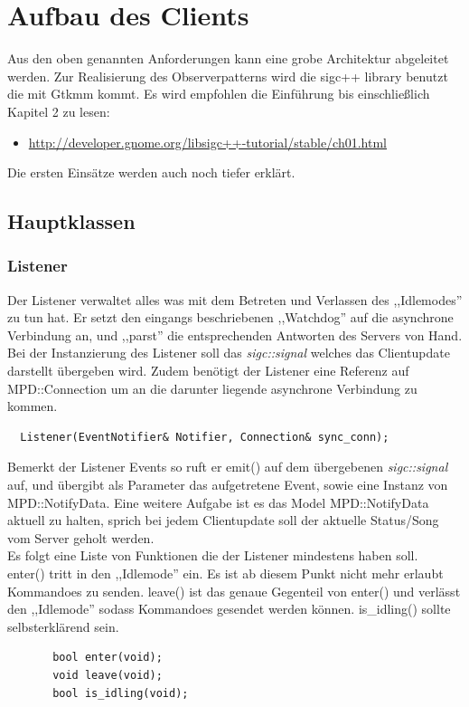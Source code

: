 \section{Aufbau des Clients}

Aus den oben genannten Anforderungen kann eine grobe Architektur abgeleitet werden.
Zur Realisierung des Observerpatterns wird die sigc++ library benutzt die mit Gtkmm kommt.
Es wird empfohlen die Einführung bis einschließlich Kapitel 2 zu lesen:
\begin{itemize}
\item \url{http://developer.gnome.org/libsigc++-tutorial/stable/ch01.html}
\end{itemize}
Die ersten Einsätze werden auch noch tiefer erklärt.


\subsection{Hauptklassen}

\subsubsection{Listener}
Der Listener verwaltet alles was mit dem Betreten und Verlassen des ,,Idlemodes''
zu tun hat. Er setzt den eingangs beschriebenen ,,Watchdog'' auf die asynchrone Verbindung an,
und ,,parst'' die entsprechenden Antworten des Servers von Hand. 
\\
Bei der Instanzierung des Listener soll das \textit{sigc::signal} welches das Clientupdate darstellt übergeben wird.
Zudem benötigt der Listener eine Referenz auf MPD::Connection um an die darunter liegende asynchrone Verbindung zu kommen.  
\begin{verbatim}
  Listener(EventNotifier& Notifier, Connection& sync_conn);
\end{verbatim}

Bemerkt der Listener Events so ruft er emit() auf dem übergebenen \textit{sigc::signal} auf,
und übergibt als Parameter das aufgetretene Event, sowie eine Instanz von MPD::NotifyData.
Eine weitere Aufgabe ist es das Model MPD::NotifyData aktuell zu halten, sprich bei jedem Clientupdate soll
der aktuelle Status/Song vom Server geholt werden.
\\
Es folgt eine Liste von Funktionen die der Listener mindestens haben soll.
\\
enter() tritt in den ,,Idlemode'' ein. Es ist ab diesem Punkt nicht mehr erlaubt Kommandoes zu senden.
leave() ist das genaue Gegenteil von enter() und verlässt den ,,Idlemode'' sodass Kommandoes gesendet werden können.  
is\_idling() sollte selbsterklärend sein.
\begin{verbatim}
       bool enter(void);
       void leave(void);
       bool is_idling(void);
\end{verbatim}

